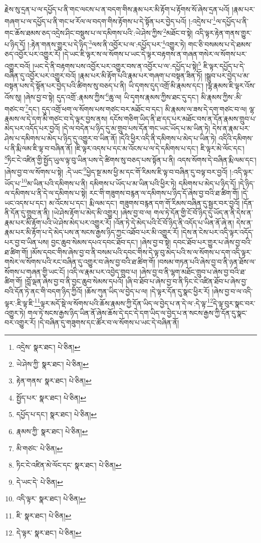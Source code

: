 རྗེས་སུ་དྲན་པ་ལ་དཔྱོད་པ་ནི་གང་ལངས་པ་ན་བདག་གིས་རྣམ་པར་མི་རྟོག་པ་རྟོགས་སོ་ཞེས་དྲན་པའོ། །རྣམ་པར་གཞག་པ་ལ་དཔྱོད་པ་ནི་གང་ཕ་རོལ་ལ་བདག་གིས་རྟོགས་པ་དེ་སྟོན་པར་བྱེད་པའོ། །:འདྲེས་པ་\footnote{འདྲེས་  སྣར་ཐང་།  པེ་ཅིན། }ལ་དཔྱོད་པ་ནི་གང་ཆོས་ཐམས་ཅད་འདྲེས་ཤིང་བསྡུས་པ་ལ་དམིགས་པའི་:ཡེ་ཤེས་ཀྱིས་\footnote{ཡེ་ཤེས་ཀྱི་  སྣར་ཐང་།  པེ་ཅིན། }མཐོང་བ་སྟེ། འདི་ལྟར་རྟེན་གནས་གྱུར་པ་ཉིད་དོ། །:རྟེན་གནས་གྱུར་པ་དེ་ཉིད་\footnote{རྟེན་གནས་  སྣར་ཐང་།  པེ་ཅིན། }ལས་ནི་འབྱོར་པ་ལ་:དཔྱོད་པར་\footnote{སྤྱོད་པར་  སྣར་ཐང་།  པེ་ཅིན། }འགྱུར་ཏེ། གང་ཅི་བསམས་པ་དེ་ཐམས་ཅད་འབྱོར་པར་འགྱུར་རོ། །དེ་ཡང་ཇི་ལྟར་ས་ལ་སོགས་པ་ཡང་དེ་ལྟར་བརྟགས་ན་གཞན་གསེར་ལ་སོགས་པར་འགྱུར་བའོ། །ཡང་དེ་ནི་བརྟགས་པས་འབྱོར་པར་འགྱུར་བས་ན་འབྱོར་པ་ལ་:དཔྱོད་པ་སྟེ།\footnote{དཔྱོད་པ་དང་།  སྣར་ཐང་།  པེ་ཅིན། } ཇི་ལྟར་དཔྱོད་པ་དེ་བཞིན་དུ་འབྱོར་པར་འགྱུར་བའོ། །རྣམ་པར་མི་རྟོག་པའི་རྣམ་པར་གཞག་པ་བསྟན་ཟིན་ཏོ། །སྒྲུབ་པར་བྱེད་པ་མ་བསྟན་པས་དེ་སྟོན་པར་བྱེད་པའི་ཚིགས་སུ་བཅད་པ་ནི། ཡི་དྭགས་དུད་འགྲོ་མི་རྣམས་དང་། །ལྷ་རྣམས་ཇི་ལྟར་འོས་འོས་སུ། །ཞེས་བྱ་བ་སྟེ། དུད་འགྲོ་:རྣམས་ཀྱིས་\footnote{རྣམས་ཀྱི་  སྣར་ཐང་།  པེ་ཅིན། }ཆུ་ལ། ཡི་དྭགས་རྣམས་ཀྱིས་ཐང་དུ་དང་། མི་རྣམས་ཀྱིས་:མི་གཙང་བ་\footnote{མི་གཙང་  པེ་ཅིན། }དང་། དུད་འགྲོ་ཕག་ལ་སོགས་པས་གཙང་བར་མཐོང་བ་དང་། མི་རྣམས་ལ་ཟས་དེ་དག་གཙང་བ་ལ། ལྷ་རྣམས་ལ་དེ་དག་མི་གཙང་བ་དེ་ལྟར་བྱས་ནས། དངོས་གཅིག་ཡིད་ནི་ཐ་དད་པར་མཐོང་བས་ན་དོན་རྣམས་གྲུབ་པ་མེད་པར་འདོད་པར་བྱའོ། །དེ་ལ་བདེན་པ་ཉིད་དུ་མ་གྲུབ་པས་དོན་གང་ཡང་ཡོད་པ་མ་ཡིན་ཏེ། དེས་ན་རྣམ་པར་ཤེས་པ་དམིགས་པ་མེད་པ་ཉིད་དུ་འགྱུར་བ་ཡིན་ནོ། །དེའི་ཕྱིར་འདི་ནི་དམིགས་པ་མེད་པ་ཡིན་ཏེ། འདིའི་དམིགས་པ་ནི་རྨི་ལམ་ཇི་ལྟ་བ་བཞིན་ནོ། །ཇི་ལྟར་འདས་པ་དང་མ་འོངས་པ་ལ་དེ་དམིགས་པ་དང་། ཇི་ལྟར་མེ་ལོང་དང་། \footnote{ཏིང་ངེ་འཛིན་མེ་ལོང་དང་  སྣར་ཐང་།  པེ་ཅིན། }ཏིང་ངེ་འཛིན་གྱི་སྤྱོད་ཡུལ་ལྟ་བུ་ཡིན་པས་དེ་ཚིགས་སུ་བཅད་པས་སྟོན་པ་ནི། འདས་སོགས་དེ་བཞིན་རྨི་ལམ་དང་། །ཞེས་བྱ་བ་ལ་སོགས་པ་སྟེ། :དེ་ཡང་\footnote{དེ་ཡང་དེ་  པེ་ཅིན། }ཕྱེད་སྔ་མས་ཕྱི་མ་དང་གོ་རིམས་ཇི་ལྟ་བ་བཞིན་དུ་བལྟ་བར་བྱའོ། །:འདི་ལྟར་ཡོད་པ་\footnote{འདི་ལྟར་  སྣར་ཐང་།  པེ་ཅིན། }མ་ཡིན་པའི་དམིགས་པ་ནི། དམིགས་པ་ཡོད་པ་མ་ཡིན་པའི་ཕྱིར་ཏེ། དམིགས་པ་མེད་པ་ཉིད་དོ། །དེ་ཉིད་ལ་དམིགས་པ་ནི་དེ་ལ་དམིགས་པ་སྟེ། རང་གི་གཟུགས་བརྙན་ལ་དམིགས་པ་ཉིད་དོ་ཞེས་བྱ་བའི་ཐ་ཚིག་གོ། །དེ་ཡང་འདས་པ་དང་། མ་འོངས་པ་དང་། རྨི་ལམ་དང་། གཟུགས་བརྙན་དག་གོ་རིམས་བཞིན་དུ་སྦྱར་བར་བྱའོ། །དོན་ནི་དོན་དུ་གྲུབ་ན་ནི། །ཡེ་ཤེས་རྟོག་པ་མེད་མི་འགྱུར། །ཞེས་བྱ་བ་ལ། གལ་ཏེ་དོན་གྱི་ངོ་བོ་ཉིད་དུ་ཡོད་ན་ནི་དེས་ན་རྣམ་པར་མི་རྟོག་པའི་ཡེ་ཤེས་མེད་པར་འགྱུར་རོ། །འོན་ཏེ་དེ་མེད་པའི་ངོ་བོ་ཉིད་ནི་འདོད་པ་ཡིན་ནོ་ཞེ་ན། དེས་ན་རྣམ་པར་མི་རྟོག་པ་དེ་མེད་པས་ན་སངས་རྒྱས་ཉིད་ཀྱང་འཐོབ་པར་མི་འགྱུར་རོ། །དེས་ན་ངེས་པར་འདི་ལྟར་འདོད་པར་བྱ་བ་ཡིན་པས། བྱང་ཆུབ་སེམས་དཔའ་དབང་ཐོབ་དང་། །ཞེས་བྱ་བ་སྟེ། དབང་ཐོབ་པར་གྱུར་པ་ཞེས་བྱ་བའི་ཐ་ཚིག་གོ། །མོས་དབང་གིས་ཞེས་བྱ་བ་ནི་བསམ་པའི་དབང་གིས་དེ་ལྟ་བུ་མེད་པའི་ས་ལ་སོགས་པ་དག་འདི་ལྟར་གསེར་ལ་སོགས་པའི་རང་བཞིན་དུ་འགྱུར་བ་ཞེས་བྱ་བའི་ཐ་ཚིག་གོ། །བསམ་གཏན་པའི་ཞེས་བྱ་བ་ནི་ཉན་ཐོས་ལ་སོགས་པ་གཞན་གྱི་ཡང་ངོ། །འདི་ལ་རྣམ་པར་འབྱེད་གྲུབ་པ། །ཞེས་བྱ་བ་ནི་ལྷག་མཐོང་གྲུབ་པ་ཞེས་བྱ་བའི་ཐ་ཚིག་གོ། །བློ་ལྡན་ཞེས་བྱ་བ་ནི་བྱང་ཆུབ་སེམས་དཔའོ། །ཞི་བ་ཐོབ་པ་ཞེས་བྱ་བ་ནི་ཏིང་ངེ་འཛིན་ཐོབ་པ་ཞེས་བྱ་བའི་དོན་ཏེ་ནང་གི་བདག་ཉིད་ཀྱིའོ། །ཆོས་ཀུན་ཡིད་ལ་བྱེད་པ་ལ། །དེ་ལྟར་དོན་དུ་སྣང་ཕྱིར་རོ། །ཞེས་བྱ་བ་ལ་འདི་ལྟར་:ཇི་ལྟ་ཇི་\footnote{ཇི་  སྣར་ཐང་།  པེ་ཅིན། }ལྟར་མདོ་སྡེ་ལ་སོགས་པའི་ཆོས་རྣམས་ཀྱི་དོན་ཡིད་ལ་བྱེད་པ་ན་དེ་ལ་:དེ་ལྟ་\footnote{དེ་ལྟར་  སྣར་ཐང་།  པེ་ཅིན། }དེ་ལྟ་བུར་སྣང་བར་འགྱུར་ཏེ། གལ་ཏེ་སངས་རྒྱས་ཉིད་ཡིན་ནོ་ཞེས་ཆོས་དེ་དང་དེ་དག་ཡིད་ལ་བྱེད་པ་ན་སངས་རྒྱས་ཀྱི་དོན་དུ་སྣང་བར་འགྱུར་རོ། །དེ་བཞིན་དུ་གཟུགས་དང་ཚོར་བ་ལ་སོགས་པ་ཡང་དེ་བཞིན་ནོ། 